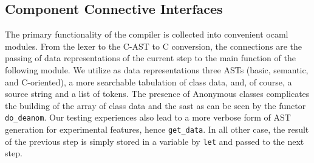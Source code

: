 \subsection{Component Connective Interfaces}


The primary functionality of the compiler is collected into convenient ocaml modules. From the lexer to the C-AST to C conversion, the connections are the passing of data representations of the current step to the main function of the following module. We utilize as data representations three ASTs (basic, semantic, and C-oriented), a more searchable tabulation of class data, and, of course, a source string and a list of tokens. The presence of Anonymous classes complicates the building of the array of class data and the sast as can be seen by the functor \verb!do_deanom!. Our testing experiences also lead to a more verbose form of AST generation for experimental features, hence \verb!get_data!. In all other case, the result of the previous step is simply stored in a variable by \verb!let! and passed to the next step.
